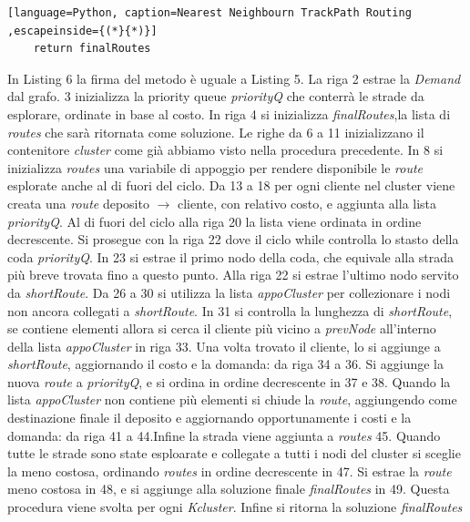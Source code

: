 \documentclass[]{article}
\begin{document}
\begin{itemize}
\begin{lstlisting}[language=Python, caption=Nearest Neighbourn TrackPath Routing ,escapeinside={(*}{*)}]
	return finalRoutes
\end{lstlisting}
In Listing 6 la firma del metodo è uguale a Listing 5. La  riga 2 estrae la \textit{Demand} dal grafo.
3 inizializza la priority queue \textit{priorityQ} che conterrà le strade da esplorare, ordinate in base al costo. In riga 4 si inizializza \textit{finalRoutes},la lista di \emph{routes} che sarà ritornata come soluzione. Le righe da 6 a 11 inizializzano il contenitore \textit{cluster} come già abbiamo visto nella procedura precedente. In 8 si inizializza \textit{routes} una variabile di appoggio per rendere disponibile le \emph{route} esplorate anche al di fuori del ciclo. Da 13 a 18 per ogni cliente nel cluster viene creata una \emph{route} deposito $\rightarrow$ cliente, con relativo costo, e aggiunta alla lista \textit{priorityQ}.
Al di fuori del ciclo alla riga 20 la lista viene ordinata in ordine decrescente. Si prosegue con la riga 22 dove il ciclo while controlla lo stasto della coda \textit{priorityQ}. In 23 si estrae il primo nodo della coda, che equivale alla strada più breve trovata fino a questo punto. Alla riga 22 si estrae l'ultimo nodo servito da \textit{shortRoute}. Da 26 a 30 si utilizza la lista \textit{appoCluster} per collezionare i nodi non ancora collegati a \textit{shortRoute}. In 31 si controlla la lunghezza di  \textit{shortRoute}, se contiene elementi allora si cerca il cliente più vicino a \textit{prevNode} all'interno della lista \textit{appoCluster} in riga 33. Una volta trovato il cliente, lo si aggiunge a \textit{shortRoute}, aggiornando il costo e la domanda: da riga 34 a 36. Si aggiunge la nuova \emph{route} a \textit{priorityQ}, e si ordina in ordine decrescente in 37 e 38.
Quando la lista \textit{appoCluster} non contiene più elementi si chiude la \emph{route}, aggiungendo come destinazione finale il deposito e aggiornando opportunamente i costi e la domanda: da riga 41 a 44.Infine la strada viene aggiunta a \textit{routes} 45. Quando tutte le strade sono state esploarate e collegate a tutti i nodi del cluster si sceglie la meno costosa, ordinando \textit{routes} in ordine decrescente in 47. Si  estrae la \emph{route} meno costosa in 48, e si aggiunge alla soluzione finale \textit{finalRoutes} in 49. Questa procedura viene svolta per ogni \textit{Kcluster}. Infine si ritorna la soluzione  \textit{finalRoutes}


\end{itemize}
\end{document}

